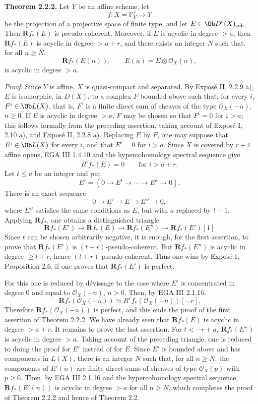 \textbf{Theorem 2.2.2.} Let \(Y\) be an affine scheme, let
\[
  f:X=\mathbb P^r_Y\longrightarrow Y
\]
be the projection of a projective space of finite type, and let \(E\in \Ob D^b(X)_{\mathrm{coh}}\). Then \(\mathbf Rf_*(E)\) is pseudo-coherent. Moreover, if \(E\) is acyclic in degree \(>a\), then \(\mathbf Rf_*(E)\) is acyclic in degree \(>a+r\), and there exists an integer \(N\) such that, for all \(n\geq N\),
\[
  \mathbf Rf_*(E(n)),\qquad E(n)=E\otimes\mathcal O_X(n),
\]
is acyclic in degree \(>a\).

\emph{Proof.} Since \(Y\) is affine, \(X\) is quasi-compact and separated. By Exposé II, 2.2.9 a), \(E\) is isomorphic, in \(D(X)\), to a complex \(F\) bounded above such that, for every \(i\), \(F^i\in \Ob L(X)\), that is, \(F^i\) is a finite direct sum of sheaves of the type \(\mathcal O_X(-n)\), \(n\geq 0\). If \(E\) is acyclic in degree \(>a\), \(F\) may be chosen so that \(F^i=0\) for \(i>a\); this follows formally from the preceding assertion, taking account of Exposé I, 2.10 a), and Exposé II, 2.2.8 a). Replacing \(E\) by \(F\), one may suppose that \(E^i\in \Ob L(X)\) for every \(i\), and that \(E^i=0\) for \(i>a\). Since \(X\) is covered by \(r+1\) affine opens, EGA III 1.4.10 and the hypercohomology spectral sequence give
\[
  R^if_*(E)=0\qquad\text{for }i>a+r.
\]
Let \(t\leq a\) be an integer and put
\[
  E'=(0\to E^t\to\cdots\to E^a\to 0).
\]
There is an exact sequence
\[
  0\longrightarrow E'\longrightarrow E\longrightarrow E''\longrightarrow 0,
\]
where \(E''\) satisfies the same conditions as \(E\), but with \(a\) replaced by \(t-1\). Applying \(\mathbf Rf_*\), one obtains a distinguished triangle
\[
\mathbf Rf_*(E')\longrightarrow \mathbf Rf_*(E)\longrightarrow \mathbf Rf_*(E'')\longrightarrow \mathbf Rf_*(E')[1]
\]
Since \(t\) can be chosen arbitrarily negative, it is enough, for the first assertion, to prove that \(\mathbf Rf_*(E')\) is \((t+r)\)-pseudo-coherent. But \(\mathbf Rf_*(E'')\) is acyclic in degree \(\geq t+r\), hence \((t+r)\)-pseudo-coherent. Thus one wins by Exposé I, Proposition 2.6, if one proves that \(\mathbf Rf_*(E')\) is perfect.

For this one is reduced by dévissage to the case where \(E'\) is concentrated in degree \(0\) and equal to \(\mathcal O_X(-n)\), \(n>0\). Then, by EGA III 2.1.16,
\[
  \mathbf Rf_*(\mathcal O_X(-n))\simeq R^rf_*(\mathcal O_X(-n))[-r].
\]
Therefore \(\mathbf Rf_*(\mathcal O_X(-n))\) is perfect, and this ends the proof of the first assertion of Theorem 2.2.2. We have already seen that \(\mathbf Rf_*(E)\) is acyclic in degree \(>a+r\). It remains to prove the last assertion. For \(t<-r+a\), \(\mathbf Rf_*(E'')\) is acyclic in degree \(>a\). Taking account of the preceding triangle, one is reduced to doing the proof for \(E'\) instead of for \(E\). Since \(E'\) is bounded above and has components in \(L(X)\), there is an integer \(N\) such that, for all \(n\geq N\), the components of \(E'(n)\) are finite direct sums of sheaves of type \(\mathcal O_X(p)\) with \(p\geq 0\). Then, by EGA III 2.1.16 and the hypercohomology spectral sequence, \(\mathbf Rf_*(E'(n))\) is acyclic in degree \(>a\) for all \(n\geq N\), which completes the proof of Theorem 2.2.2 and hence of Theorem 2.2.

